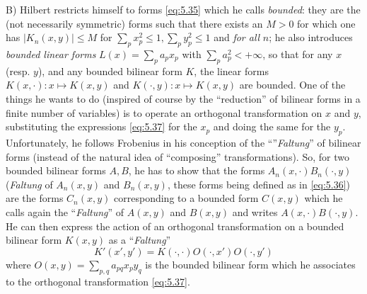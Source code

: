 \documentclass[12pt,a4paper,leqno,twoside]{extbook}
\begin{document}
B) Hilbert restricts himself to forms \eqref{eq:5.35} which he calls \emph{bounded}: they are the (not necessarily symmetric) forms such that there exists an \(M > 0\) for which one has \(|K_n(x,y)| \leq M\) for \(\sum\limits_p x_p^2 \leq 1, \sum_p y_p^2 \leq 1\) and \emph{for all} \(n\); he also introduces \emph{bounded linear forms} \(L(x) = \sum\limits_p a_p x_p\) with \(\sum\limits_p a_p^2 < +\infty\), so that for any \(x\) (resp. \(y\)), and any bounded bilinear form \(K\), the linear forms \(K(x,\cdot): x \mapsto K(x,y)\) and \(K(\cdot,y): x \mapsto K(x,y)\) are bounded. One of the things he wants to do (inspired of course by the ``reduction'' of bilinear forms in a finite number of variables) is to operate an orthogonal transformation on \(x\) and \(y\), substituting the expressions \eqref{eq:5.37} for the \(x_p\) and doing the same for the \(y_p\). Unfortunately, he follows Frobenius in his conception of the ``''\emph{Faltung}'' of bilinear forms (instead of the natural idea of ``composing'' transformations). So, for two bounded bilinear forms \(A, B\), he has to show that the forms \(A_n(x,\cdot) B_n(\cdot,y)\) (\emph{Faltung} of \(A_n(x,y)\) and \(B_n(x,y)\), these forms being defined as in \eqref{eq:5.36}) are the forms \(C_n(x,y)\) corresponding to a bounded form \(C(x,y)\) which he calls again the ``\emph{Faltung}'' of \(A(x,y)\) and \(B(x,y)\) and writes \(A(x,\cdot) B(\cdot,y)\). He can then express the action of an orthogonal transformation on a bounded bilinear form \(K(x,y)\) as a ``\emph{Faltung}''
\begin{equation}
    \label{eq:5.39}
    K'(x', y') = K(\cdot, \cdot) O(\cdot, x')O(\cdot, y')
\end{equation}
where \(O(x,y) = \sum\limits_{p,q} a_{pq} x_p y_q\) is the bounded bilinear form which he associates to the orthogonal transformation \eqref{eq:5.37}.
\end{document}
